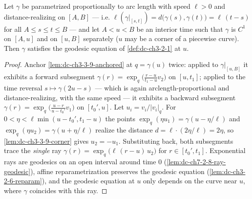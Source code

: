 \begin{lemma}
  \label{lem:dc-ch3-3-9-localization}


  Let $\gamma$ be parametrized proportionally to arc length with speed
  $\ell>0$ and distance-realizing on $[A,B]$ — i.e.
  $\ell(\gamma|_{[s,t]})=d\big(\gamma(s),\gamma(t)\big)=\ell\,(t-s)$ for all
  $A\le s\le t\le B$ — and let $A<u<B$ be an interior time such that
  $\gamma$ is $C^1$ on $[A,u]$ and on $[u,B]$ separately ($u$ may be a corner
  of a piecewise curve). Then $\gamma$ satisfies the geodesic equation of
  \cref{def:dc-ch3-2-1} at $u$.
\end{lemma}
\begin{proof}
  \sketch

  Anchor \cref{lem:dc-ch3-3-9-anchored} at $q=\gamma(u)$ twice: applied to
  $\gamma|_{[u,B]}$ it exhibits a forward subsegment
  $\gamma(r)=\exp_q\big(\tfrac{r-u}{t_1-u}v_2\big)$ on $[u,t_1]$; applied to
  the time reversal $s\mapsto\gamma(2u-s)$ — which is again
  arclength-proportional and distance-realizing, with the same speed — it
  exhibits a backward subsegment
  $\gamma(r)=\exp_q\big(\tfrac{u-r}{u-t_0'}v_1\big)$ on $[t_0',u]$. Let
  $u_i=v_i/|v_i|_q$. For $0<\eta<\ell\min(u-t_0',t_1-u)$ the points
  $\exp_q(\eta u_1)=\gamma(u-\eta/\ell)$ and
  $\exp_q(\eta u_2)=\gamma(u+\eta/\ell)$ realize the distance
  $d=\ell\cdot(2\eta/\ell)=2\eta$, so \cref{lem:dc-ch3-3-9-corner} gives
  $u_2=-u_1$. Substituting back, both subsegments trace the \emph{single}
  ray $\gamma(r)=\exp_q\big(\ell\,(r-u)\,u_2\big)$ for
  $r\in[t_0',t_1]$. Exponential rays are geodesics on an open interval
  around time $0$ (\cref{lem:dc-ch7-2-8-ray-geodesic}), affine
  reparametrization preserves the geodesic equation
  (\cref{lem:dc-ch3-2-6-reparam}), and the geodesic equation at $u$ only
  depends on the curve near $u$, where $\gamma$ coincides with this ray.

\end{proof}

